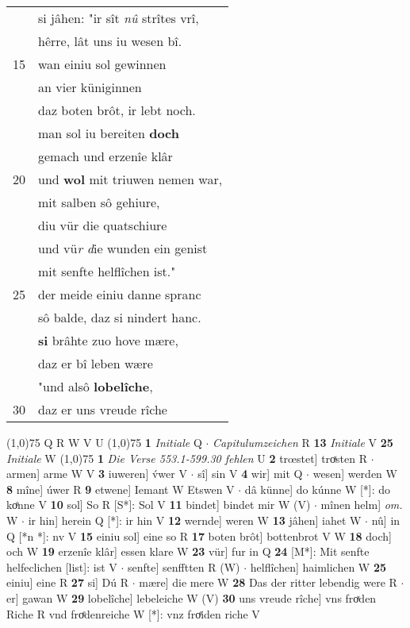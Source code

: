 \documentclass[8pt,a4paper,notitlepage]{article}
\begin{document}
\begin{table}[ht]
\begin{minipage}[t]{0.5\linewidth}
\begin{tabular}{rl}
 & si jâhen: "ir sît \textit{nû} strîtes vrî,\\ 
 & hêrre, lât uns iu wesen bî.\\ 
15 & wan einiu sol gewinnen\\ 
 & an vier küniginnen\\ 
 & daz boten brôt, ir lebt noch.\\ 
 & man sol iu bereiten \textbf{doch}\\ 
 & gemach und erzenîe klâr\\ 
20 & und \textbf{wol} mit triuwen nemen war,\\ 
 & mit salben sô gehiure,\\ 
 & diu vür die quatschiure\\ 
 & und vü\textit{r d}ie wunden ein genist\\ 
 & mit senfte helflîchen ist."\\ 
25 & der meide einiu danne spranc\\ 
 & sô balde, daz si nindert hanc.\\ 
 & \textbf{si} brâhte zuo hove mære,\\ 
 & daz er bî leben wære\\ 
 & "und alsô \textbf{lobelîche},\\ 
30 & daz er uns vreude rîche\\ 
\end{tabular}
\scriptsize
\line(1,0){75} \newline
Q R W V U \newline
\line(1,0){75} \newline
\textbf{1} \textit{Initiale} Q   $\cdot$ \textit{Capitulumzeichen} R  \textbf{13} \textit{Initiale} V  \textbf{25} \textit{Initiale} W  \newline
\line(1,0){75} \newline
\textbf{1} \textit{Die Verse 553.1-599.30 fehlen} U  \textbf{2} trœstet] troͯsten R  $\cdot$ armen] arme W V \textbf{3} iuweren] v́wer V  $\cdot$ sî] sin V \textbf{4} wir] mit Q  $\cdot$ wesen] werden W \textbf{8} mîne] úwer R \textbf{9} etwene] Iemant W Etswen V  $\cdot$ dâ künne] do kúnne W [*]: do koͤnne V \textbf{10} sol] So R [S*]: Sol V \textbf{11} bindet] bindet mir W (V)  $\cdot$ mînen helm] \textit{om.} W  $\cdot$ ir hin] herein Q [*]: ir hin V \textbf{12} wernde] weren W \textbf{13} jâhen] iahet W  $\cdot$ nû] in Q [*n *]: nv V \textbf{15} einiu sol] eine so R \textbf{17} boten brôt] bottenbrot V W \textbf{18} doch] och W \textbf{19} erzenîe klâr] essen klare W \textbf{23} vür] fur in Q \textbf{24} [M*]: Mit senfte helfeclichen [list]: ist V  $\cdot$ senfte] senfftten R (W)  $\cdot$ helflîchen] haimlichen W \textbf{25} einiu] eine R \textbf{27} si] Dú R  $\cdot$ mære] die mere W \textbf{28} Das der ritter lebendig were R  $\cdot$ er] gawan W \textbf{29} lobelîche] lebeleiche W (V) \textbf{30} uns vreude rîche] vns froͯden Riche R vnd froͤdenreiche W [*]: vnz froͤiden riche V \newline
\end{minipage}
\end{table}
\end{document}

